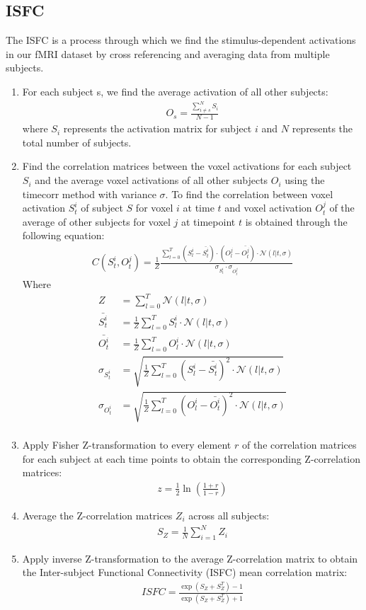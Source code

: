 \documentclass[12pt]{article}
\begin{document}
\subsection{ISFC}
The ISFC is a process through which we find the stimulus-dependent activations in our fMRI dataset by cross referencing and averaging data from multiple subjects.\\
\begin{enumerate}
\item For each subject s, we find the average activation of all other subjects:
\begin{align*}
O_s=\frac{\sum_{i\neq s}^N S_i}{N-1}
\end{align*}
where $S_i$ represents the activation matrix for subject $i$ and $N$ represents the total number of subjects.
\item Find the correlation matrices between the voxel activations for each subject $S_i$ and the average voxel activations of all other subjects $O_{i}$ using the timecorr method with variance $\sigma$. To find the correlation between voxel activation $S^i_t$ of subject $S$ for voxel $i$ at time $t$ and voxel activation $O^j_t$ of the average of other subjects for voxel $j$ at timepoint $t$ is obtained through the following equation:
\begin{align*}
C(S^i_t,O^j_t) = \frac{1}{Z}\frac{\sum_{l=0}^T (S_l^i - \bar{S^i_t})\cdot(O^j_l - \bar{O^j_t})\cdot \mathcal{N}(l|t,\sigma)}{\sigma_{S_t^i} \cdot \sigma_{O_t^j}}
\end{align*}
Where
\begin{align*}
Z &= \sum_{l=0}^T \mathcal{N}(l|t,\sigma)\\
\bar{S^i_t} &=\frac{1}{Z} \sum_{l=0}^T S^i_l \cdot \mathcal{N}(l|t,\sigma)\\
\bar{O^i_t} &=\frac{1}{Z} \sum_{l=0}^T O^i_l \cdot \mathcal{N}(l|t,\sigma)\\
\sigma_{S_t^i} &=\sqrt{ \frac{1}{Z}\sum_{l=0}^T (S_l^i-\bar{S_t^i})^2 \cdot \mathcal{N}(l|t,\sigma)}\\
\sigma_{O_t^i} &=\sqrt{ \frac{1}{Z}\sum_{l=0}^T (O_l^i-\bar{O_t^i})^2 \cdot \mathcal{N}(l|t,\sigma)}\\
\end{align*}
\item Apply Fisher Z-transformation to every element $r$ of the correlation matrices for each subject at each time points to obtain the corresponding Z-correlation matrices:
\begin{align*}
z = \frac{1}{2}\ln(\frac{1+r}{1-r})
\end{align*}
\item Average the Z-correlation matrices $Z_i$ across all subjects:
\begin{align*}
S_Z = \frac{1}{N}\sum^N_{i=1}Z_i
\end{align*}
\item Apply inverse Z-transformation to the average Z-correlation matrix to obtain the Inter-subject Functional Connectivity (ISFC) mean correlation matrix:
\begin{align*}
ISFC = \frac{\exp(S_Z+S_Z^T)-1}{\exp(S_Z+S_Z^T)+1}
\end{align*}
\end{enumerate}
\end{document}
